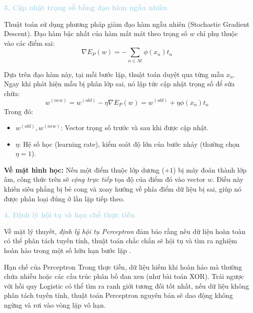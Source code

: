 \vspace{0.5em}
\noindent\textcolor{lightblue}{\textbf{3. Cập nhật trọng số bằng đạo hàm ngẫu nhiên}}
\vspace{0.5em}

Thuật toán sử dụng phương pháp giảm đạo hàm ngẫu nhiên (Stochastic Gradient Descent). Đạo hàm bậc nhất của hàm mất mát theo trọng số $w$ chỉ phụ thuộc vào các điểm sai:
\begin{equation}
    \nabla E_P(w) = - \sum_{n \in \mathcal{M}} \phi(x_n) t_n
\end{equation}

Dựa trên đạo hàm này, tại mỗi bước lặp, thuật toán duyệt qua từng mẫu $x_n$. Ngay khi phát hiện mẫu bị phân lớp sai, nó lập tức cập nhật trọng số để sửa chữa:
\begin{equation}
    w^{(new)} = w^{(old)} - \eta \nabla E_P(w) = w^{(old)} + \eta \phi(x_n) t_n
\end{equation}
Trong đó:
\begin{itemize}
    \item $w^{(old)}, w^{(new)}$: Vector trọng số trước và sau khi được cập nhật.
    \item $\eta$: Hệ số học (learning rate), kiểm soát độ lớn của bước nhảy (thường chọn $\eta = 1$). 
\end{itemize}

\textbf{Về mặt hình học:} Nếu một điểm thuộc lớp dương ($+1$) bị máy đoán thành lớp âm, công thức trên sẽ \textit{cộng trực tiếp} tọa độ của điểm đó vào vector $w$. Điều này khiến siêu phẳng bị bẻ cong và xoay hướng về phía điểm dữ liệu bị sai, giúp nó được phân loại đúng ở lần lặp tiếp theo.

\vspace{0.5em}
\noindent\textcolor{lightblue}{\textbf{4. Định lý hội tụ và hạn chế thực tiễn}}
\vspace{0.5em}

Về mặt lý thuyết, \textit{định lý hội tụ Perceptron} đảm bảo rằng nếu dữ liệu hoàn toàn có thể phân tách tuyến tính, thuật toán chắc chắn sẽ hội tụ và tìm ra nghiệm hoàn hảo trong một số hữu hạn bước lặp \cite{bishop2006pattern}.

\begin{warningbox}{Hạn chế của Perceptron}
Trong thực tiễn, dữ liệu hiếm khi hoàn hảo mà thường chứa nhiễu hoặc các cấu trúc phân bố đan xen (như bài toán XOR). Trái ngược với hồi quy Logistic có thể tìm ra ranh giới tương đối tốt nhất, nếu dữ liệu không phân tách tuyến tính, thuật toán Perceptron nguyên bản sẽ dao động không ngừng và rơi vào vòng lặp vô hạn.
\end{warningbox}

